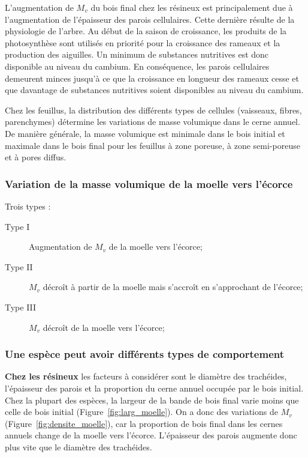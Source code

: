 L'augmentation de $M_v$ du bois final chez les résineux est principalement due à l'augmentation de l'épaisseur des parois cellulaires. Cette dernière résulte de la physiologie de l'arbre. Au début de la saison de croissance, les produits de la photosynthèse sont utilisés en priorité pour la croissance des rameaux et la production des aiguilles. Un minimum de substances nutritives est donc disponible au niveau du cambium.  En conséquence, les parois cellulaires demeurent minces jusqu'à ce que la croissance en longueur des rameaux cesse et que davantage de substances nutritives soient disponibles au niveau du cambium.

Chez les feuillus, la distribution des différents types de cellules (vaisseaux, fibres, parenchymes) détermine les variations de masse volumique dans le cerne annuel. De manière générale, la masse volumique est minimale dans le bois initial et maximale dans le bois final pour les feuillus à zone poreuse, à zone semi-poreuse et à pores diffus.
%
\subsubsection{Variation de la masse volumique de la moelle vers l'écorce}

Trois types :

\begin{description}
\item[Type I] Augmentation de $M_v$ de la moelle vers l'écorce;
\item[Type II] $M_v$ décroît à partir de la moelle mais s'accroît en s'approchant de l'écorce;
\item[Type III] $M_v$ décroît de la moelle vers l'écorce;
\end{description}


\subsubsection{Une espèce peut avoir différents types de comportement}

\textbf{Chez les résineux} les facteurs à considérer sont le diamètre des trachéides, l'épaisseur des parois et la proportion du cerne annuel occupée par le bois initial. Chez la plupart des espèces, la largeur de la bande de bois final varie moins que celle de bois initial (Figure~\ref{fig:larg_moelle}). On a donc des variations de $M_v$ (Figure~\ref{fig:densite_moelle}), car la proportion de bois final dans les cernes annuels change de la moelle vers l'écorce. L'épaisseur des parois augmente donc plus vite que le diamètre des trachéides.\\


